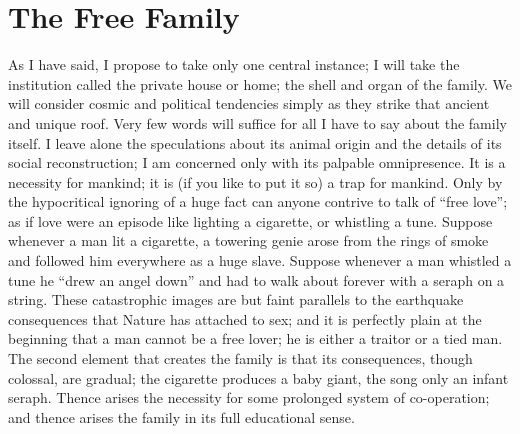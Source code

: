 \documentclass{book}
\begin{document}
\chapter{The Free Family}
\label{chapter-8}
As I have said, I propose to take only one central instance; I will take the institution called the private house or home; the shell and organ of the family. We will consider cosmic and political tendencies simply as they strike that ancient and unique roof. Very few words will suffice for all I have to say about the family itself. I leave alone the speculations about its animal origin and the details of its social reconstruction; I am concerned only with its palpable omnipresence. It is a necessity for mankind; it is (if you like to put it so) a trap for mankind. Only by the hypocritical ignoring of a huge fact can anyone contrive to talk of “free love”; as if love were an episode like lighting a cigarette, or whistling a tune. Suppose whenever a man lit a cigarette, a towering genie arose from the rings of smoke and followed him everywhere as a huge slave. Suppose whenever a man whistled a tune he “drew an angel down” and had to walk about forever with a seraph on a string. These catastrophic images are but faint parallels to the earthquake consequences that Nature has attached to sex; and it is perfectly plain at the beginning that a man cannot be a free lover; he is either a traitor or a tied man. The second element that creates the family is that its consequences, though colossal, are gradual; the cigarette produces a baby giant, the song only an infant seraph. Thence arises the necessity for some prolonged system of co-operation; and thence arises the family in its full educational sense.
\end{document}

